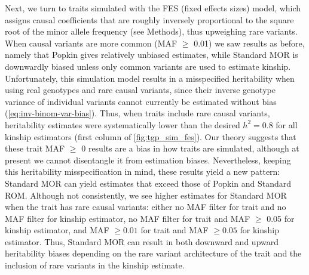\documentclass[11pt]{article}
\begin{document}
Next, we turn to traits simulated with the FES (fixed effects sizes) model, which assigns causal coefficients that are roughly inversely proportional to the square root of the minor allele frequency (see Methods), thus upweighing rare variants.
When causal variants are more common (MAF $\ge$ 0.01) we saw results as before, namely that Popkin gives relatively unbiased estimates, while Standard MOR is downwardly biased unless only common variants are used to estimate kinship.
Unfortunately, this simulation model results in a misspecified heritability when using real genotypes and rare causal variants, since their inverse genotype variance of individual variants cannot currently be estimated without bias (\cref{eq:inv-binom-var-bias}).
Thus, when traits include rare causal variants, heritability estimates were systematically lower than the desired $h^2=0.8$ for all kinship estimators (first column of \cref{fig:tgp_sim_fes}).  
Our theory suggests that these trait MAF $\ge$ 0 results are a bias in how traits are simulated, although at present we cannot disentangle it from estimation biases.  
Nevertheless, keeping this heritability misspecification in mind, these results yield a new pattern: Standard MOR can yield estimates that exceed those of Popkin and Standard ROM.  
Although not consistently, we see higher estimates for Standard MOR when the trait has rare causal variants: either no MAF filter for trait and no MAF filter for kinship estimator, no MAF filter for trait and MAF $\ge$ 0.05 for kinship estimator, and MAF $\ge 0.01$ for trait and MAF $\ge 0.05$ for kinship estimator.
Thus, Standard MOR can result in both downward and upward heritability biases depending on the rare variant architecture of the trait and the inclusion of rare variants in the kinship estimate.
\end{document}
